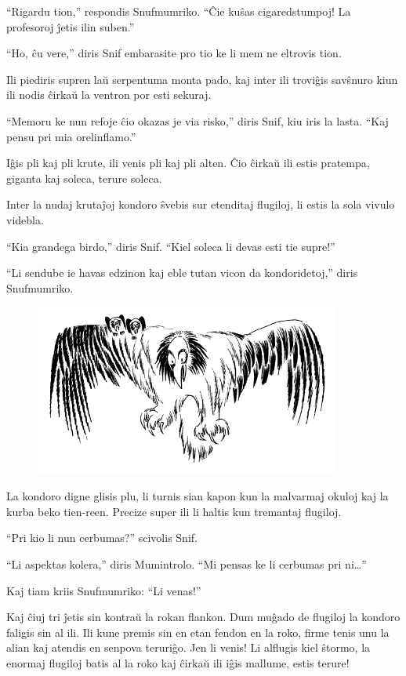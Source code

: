 ``Rigardu tion,'' respondis Snufmumriko. ``Ĉie kuŝas cigaredstumpoj! La profesoroj ĵetis ilin suben.''

``Ho, ĉu vere,'' diris Snif embarasite pro tio ke li mem ne eltrovis tion.

Ili piediris supren laŭ serpentuma monta pado, kaj inter ili troviĝis savŝnuro kiun ili nodis ĉirkaŭ la ventron por esti sekuraj.

``Memoru ke nun refoje ĉio okazas je via risko,'' diris Snif, kiu iris la lasta. ``Kaj pensu pri mia orelinflamo.''

Iĝis pli kaj pli krute, ili venis pli kaj pli alten. Ĉio ĉirkaŭ ili estis pratempa, giganta kaj soleca, terure soleca.

Inter la nudaj krutaĵoj kondoro ŝvebis sur etenditaj flugiloj, li estis la sola vivulo videbla.

``Kia grandega birdo,'' diris Snif. ``Kiel soleca li devas esti tie supre!''

``Li sendube ie havas edzinon kaj eble tutan vicon da kondoridetoj,'' diris Snufmumriko.

\begin{figure}[htbp]
\centering
\includegraphics[width=284pt,height=160pt]{4-2.png}
\caption{}
\label{4-2}
\end{figure}

La kondoro digne glisis plu, li turnis sian kapon kun la malvarmaj okuloj kaj la kurba beko tien-reen. Precize super ili li haltis kun tremantaj flugiloj.

``Pri kio li nun cerbumas?'' scivolis Snif.

``Li aspektas kolera,'' diris Mumintrolo. ``Mi pensas ke li cerbumas pri ni{\ldots}''

Kaj tiam kriis Snufmumriko: ``Li venas!''

Kaj ĉiuj tri ĵetis sin kontraŭ la rokan flankon. Dum muĝado de flugiloj la kondoro faligis sin al ili. Ili kune premis sin en etan fendon en la roko, firme tenis unu la alian kaj atendis en senpova teruriĝo. Jen li venis! Li alflugis kiel ŝtormo, la enormaj flugiloj batis al la roko kaj ĉirkaŭ ili iĝis mallume, estis terure!

